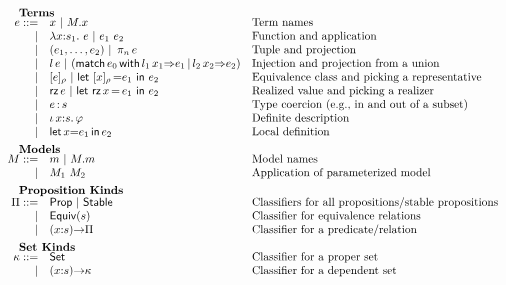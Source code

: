 \begin{figure}
\[\begin{array}{rl@{\quad}l}
		\noalign{\textbf{Terms}}	
		\ie ::=
		    & \ix \ibar \iselect{\im}{\ix} &\mbox{Term names}\\
		  | & \ilambda{\ix}{\is_1}{\ie} \ibar 
		      \iapp{\ie_1}{\ie_2} &\mbox{Function and application}\\
		  | & \ituple{\ie_1}{\ie_2} 
		      \ibar \iproj{\ie}{n}&\mbox{Tuple and projection}\\
		  | & \iinj{\il}{\ie} 
		      \ibar (\imatch{\ie_0}{\il_1}{\ix_1}{\ie_1}{\il_2}{\ix_2}{\ie_2})&\mbox{Injection and projection from a union}\\
		  | & \ieclass{\ie}{\ipp}
		      \ibar \ileteclass{\ix}{\ipp}{\ie_1}{\ie_2}&\mbox{Equivalence class and picking a representative}\\
		  | & \irz{\ie}
		      \ibar \iletrz{\ix}{\ie_1}{\ie_2}&\mbox{Realized value and picking a realizer}\\
		  | & \icoerce{\ie}{\is} &\mbox{Type coercion (e.g., in and out of a subset)}\\
		  | & \ithe{\ix}{\is}{\ip}&\mbox{Definite description}\\
		  | & \ilet{\ix}{\ie_1}{\ie_2}&\mbox{Local definition}\\[5pt]
		
		\noalign{\textbf{Models}}		
		\im ::= 
		    & \iM  \ibar \iselect{\im}{\iM}&\mbox{Model names}\\
		  | & \iapp{\im_1}{\im_2}&\mbox{Application of parameterized model}\\[5pt]
		
		\noalign{\textbf{Proposition Kinds}}
		\ipt ::=
		    & \iProp \ibar \iStable & \mbox{Classifiers for all propositions/stable propositions}\\
		  | & \iEquiv{\is} &\mbox{Classifier for equivalence relations}\\
		  | & \idarrow{\ix}{\is}{\ipt} & \mbox{Classifier for a predicate/relation}\\[5pt] 
		
		\noalign{\textbf{Set Kinds}}
		\ik ::= 
		    & \iSet &\mbox{Classifier for a proper set}\\
		   | & \idarrow{\ix}{\is}{\ik} &\mbox{Classifier for a dependent set}\\[5pt]
		


\end{array}\]
\end{figure}

